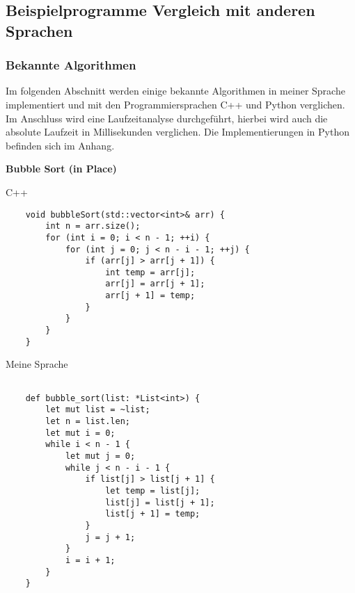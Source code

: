     \subsection{Beispielprogramme  Vergleich mit anderen Sprachen}
        \subsubsection{Bekannte Algorithmen}
    Im folgenden Abschnitt werden einige bekannte Algorithmen in meiner
    Sprache implementiert und mit den Programmiersprachen C++ und Python verglichen.
    Im Anschluss wird eine Laufzeitanalyse durchgeführt, hierbei wird auch 
    die absolute Laufzeit in Millisekunden verglichen.
    Die Implementierungen in Python befinden sich im Anhang.
    
    \begin{center}
        \textbf{Bubble Sort (in Place)}
    \end{center}

    \begin{center}
        C++
    \end{center}

        \begin{lstlisting}
    void bubbleSort(std::vector<int>& arr) {
        int n = arr.size();
        for (int i = 0; i < n - 1; ++i) {
            for (int j = 0; j < n - i - 1; ++j) {
                if (arr[j] > arr[j + 1]) {
                    int temp = arr[j];
                    arr[j] = arr[j + 1];
                    arr[j + 1] = temp;
                }
            }
        }
    }
        \end{lstlisting}
        \newpage

        \begin{center}
            Meine Sprache
        \end{center}
        \begin{lstlisting}

    def bubble_sort(list: *List<int>) {
        let mut list = ~list;
        let n = list.len;
        let mut i = 0;
        while i < n - 1 {
            let mut j = 0;
            while j < n - i - 1 {
                if list[j] > list[j + 1] {
                    let temp = list[j];
                    list[j] = list[j + 1];
                    list[j + 1] = temp;
                }
                j = j + 1;
            }
            i = i + 1;
        }
    }

        \end{lstlisting}

